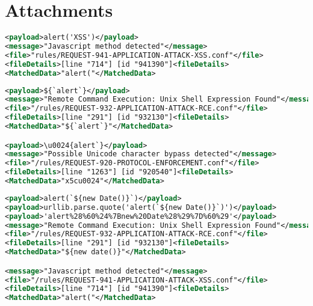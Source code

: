 \section{Attachments}

%
\begin{lstlisting}[style=ruleStyle, language=XML, caption=alert('XSS'), label={lst:alertxssblocked}]
<payload>alert('XSS')</payload>
<message>"Javascript method detected"</message>
<file>"rules/REQUEST-941-APPLICATION-ATTACK-XSS.conf"</file>
<fileDetails>[line "714"] [id "941390"]<fileDetails>
<MatchedData>"alert("</MatchedData>
\end{lstlisting}

\begin{lstlisting}[style=ruleStyle, language=XML, caption=unicode tests \$\{`alert`\}, label={lst:jsonunicodetests}]
<payload>${`alert`}</payload>
<message>"Remote Command Execution: Unix Shell Expression Found"</message>
<file>"/rules/REQUEST-932-APPLICATION-ATTACK-RCE.conf"</file>
<fileDetails>[line "291"] [id "932130"]<fileDetails>
<MatchedData>"${`alert`}"</MatchedData>

<payload>\u0024{alert`}</payload>
<message>"Possible Unicode character bypass detected"</message>
<file>"/rules/REQUEST-920-PROTOCOL-ENFORCEMENT.conf"</file>
<fileDetails>[line "1263"] [id "920540"]<fileDetails>
<MatchedData>"x5cu0024"</MatchedData>
\end{lstlisting}


\begin{lstlisting}[style=ruleStyle, language=XML, caption=url encoded example blocked, label={lst:urlencodedexampleblocked}]
<payload>alert(`${new Date()}`)</payload>
<payload>urllib.parse.quote('alert(`${new Date()}`)')</payload>
<payload>'alert%28%60%24%7Bnew%20Date%28%29%7D%60%29'</payload>
<message>"Remote Command Execution: Unix Shell Expression Found"</message>
<file>"/rules/REQUEST-932-APPLICATION-ATTACK-RCE.conf"</file>
<fileDetails>[line "291"] [id "932130"]<fileDetails>
<MatchedData>"${new date()}"</MatchedData>

<message>"Javascript method detected"</message>
<file>"/rules/REQUEST-941-APPLICATION-ATTACK-XSS.conf"</file>
<fileDetails>[line "714"] [id "941390"]<fileDetails>
<MatchedData>"alert("</MatchedData>
\end{lstlisting}


